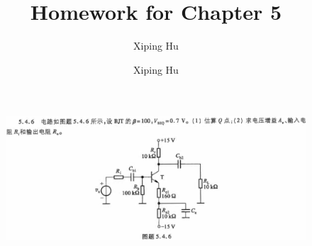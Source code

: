 \documentclass{article}
\author{Xiping Hu}
\author{Xiping Hu}
\affil{https://hxp.plus/}
\title{Homework for Chapter 5}
\begin{document}
\maketitle

\begin{figure}[H]
  \centering
  \includegraphics[width=\linewidth]{figures/Problem546}
  \label{fig:}
\end{figure}
\end{document}
